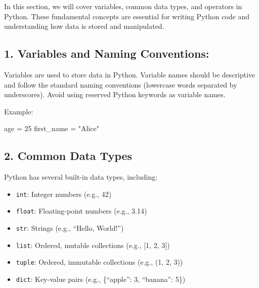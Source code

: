 \documentclass[
  paper=a4,
  ,captions=tableheading
]{scrartcl}
\newenvironment{Shaded}{}{}
\newcommand{\DecValTok}[1]{\textcolor[rgb]{0.25,0.63,0.44}{#1}}
\newcommand{\NormalTok}[1]{#1}
\newcommand{\OperatorTok}[1]{\textcolor[rgb]{0.40,0.40,0.40}{#1}}
\newcommand{\StringTok}[1]{\textcolor[rgb]{0.25,0.44,0.63}{#1}}
\providecommand{\tightlist}{%
  \setlength{\itemsep}{0pt}\setlength{\parskip}{0pt}}
\begin{document}
In this section, we will cover variables, common data types, and
operators in Python. These fundamental concepts are essential for
writing Python code and understanding how data is stored and
manipulated.

\hypertarget{variables-and-naming-conventions}{%
\subsection{\texorpdfstring{1. \textbf{Variables and Naming
Conventions}:}{1. Variables and Naming Conventions:}}\label{variables-and-naming-conventions}}

Variables are used to store data in Python. Variable names should be
descriptive and follow the standard naming conventions (lowercase words
separated by underscores). Avoid using reserved Python keywords as
variable names.

Example:

\begin{Shaded}
\begin{Highlighting}[]

\NormalTok{age }\OperatorTok{=} \DecValTok{25}
\NormalTok{first\_name }\OperatorTok{=} \StringTok{"Alice"}
\end{Highlighting}
\end{Shaded}

\hypertarget{common-data-types}{%
\subsection{\texorpdfstring{2. \textbf{Common Data
Types}}{2. Common Data Types}}\label{common-data-types}}

Python has several built-in data types, including:

\begin{itemize}
\tightlist
\item
  \texttt{int}: Integer numbers (e.g., 42)
\item
  \texttt{float}: Floating-point numbers (e.g., 3.14)
\item
  \texttt{str}: Strings (e.g., ``Hello, World!'')
\item
  \texttt{list}: Ordered, mutable collections (e.g., {[}1, 2, 3{]})
\item
  \texttt{tuple}: Ordered, immutable collections (e.g., (1, 2, 3))
\item
  \texttt{dict}: Key-value pairs (e.g., \{``apple'': 3, ``banana'': 5\})
\end{itemize}
\end{document}
